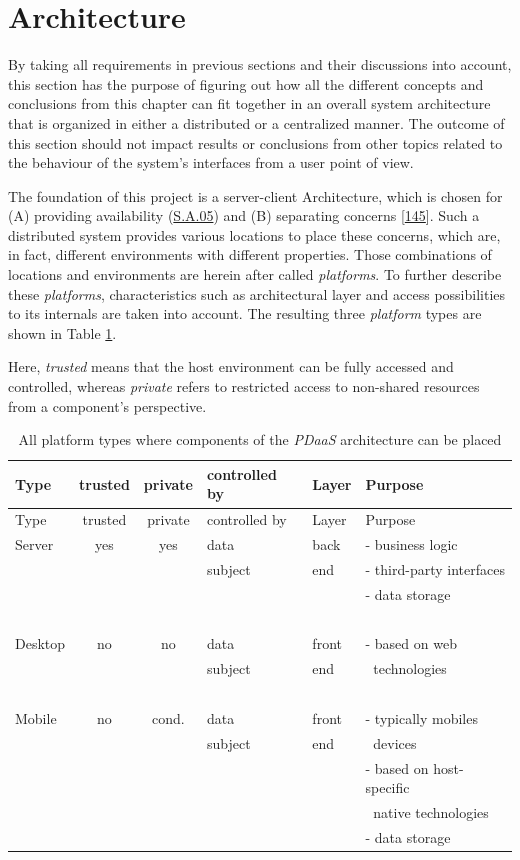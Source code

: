 \documentclass[12pt,english,a4paper,titlepage,cleardoublepage=empty,dottedtoc]{report}
\begin{document}
\section{Architecture}\label{architecture}

By taking all requirements in previous sections and their discussions
into account, this section has the purpose of figuring out how all the
different concepts and conclusions from this chapter can fit together in
an overall system architecture that is organized in either a distributed
or a centralized manner. The outcome of this section should not impact
results or conclusions from other topics related to the behaviour of the
system's interfaces from a user point of view.

The foundation of this project is a server-client Architecture, which is
chosen for (A) providing availability (\protect\hyperlink{sa05}{S.A.05})
and (B) separating concerns
{[}\protect\hyperlink{ref-web_2016_wikipedia_separation-of-concerns}{145}{]}.
Such a distributed system provides various locations to place these
concerns, which are, in fact, different environments with different
properties. Those combinations of locations and environments are herein
after called \emph{platforms}. To further describe these
\emph{platforms}, characteristics such as architectural layer and access
possibilities to its internals are taken into account. The resulting
three \emph{platform} types are shown in Table
\ref{tbl:platforms-characteristics}.

Here, \emph{trusted} means that the host environment can be fully
accessed and controlled, whereas \emph{private} refers to restricted
access to non-shared resources from a component's perspective.

\begin{longtable}[]{@{}lcclll@{}}
\caption{All platform types where components of the \emph{PDaaS}
architecture can be placed
\label{tbl:platforms-characteristics}}\tabularnewline
\toprule
Type & trusted & private & controlled by & Layer &
Purpose\tabularnewline
\midrule
\endfirsthead
\toprule
Type & trusted & private & controlled by & Layer &
Purpose\tabularnewline
\midrule
\endhead
Server & yes & yes & data & back & - business logic\tabularnewline
\(\ \) & \(\ \) & \(\ \) & subject & end & - third-party
interfaces\tabularnewline
\(\ \) & \(\ \) & \(\ \) & \(\ \) & \(\ \) & - data
storage\tabularnewline
\(\ \) & \(\ \) & \(\ \) & \(\ \) & \(\ \) & \(\ \)\tabularnewline
Desktop & no & no & data & front & - based on web\tabularnewline
\(\ \) & \(\ \) & \(\ \) & subject & end & \(\ \)
technologies\tabularnewline
\(\ \) & \(\ \) & \(\ \) & \(\ \) & \(\ \) & \(\ \)\tabularnewline
Mobile & no & cond. & data & front & - typically mobiles\tabularnewline
\(\ \) & \(\ \) & \(\ \) & subject & end & \(\ \) devices\tabularnewline
\(\ \) & \(\ \) & \(\ \) & \(\ \) & \(\ \) & - based on
host-specific\tabularnewline
\(\ \) & \(\ \) & \(\ \) & \(\ \) & \(\ \) & \(\ \) native
technologies\tabularnewline
\(\ \) & \(\ \) & \(\ \) & \(\ \) & \(\ \) & - data
storage\tabularnewline
\bottomrule
\end{longtable}
\end{document}
